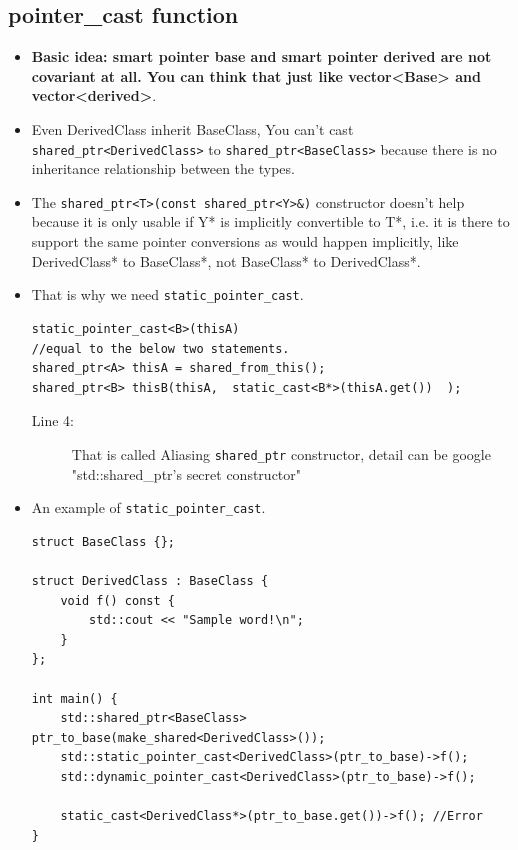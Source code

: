 \documentclass[a4paper,11pt,twoside]{book}
\begin{document}
\subsection{pointer\_cast function}
\begin{itemize}
	\item \textbf{Basic idea: smart pointer base and smart pointer derived are not covariant at all. You can think that just like vector<Base> and vector<derived>}.
			
	\item Even DerivedClass inherit BaseClass,  You can't cast \texttt{shared\_ptr<DerivedClass>} to \newline 
	\texttt{shared\_ptr<BaseClass>} because there is no inheritance relationship between the types. 
	
	\item The \texttt{shared\_ptr<T>(const shared\_ptr<Y>\&)} constructor doesn't help because it is only usable if Y* is implicitly convertible to T*, i.e. it is there to support the same pointer conversions as would happen implicitly, like DerivedClass* to BaseClass*, not BaseClass* to DerivedClass*.
	
	\item That is why we need \texttt{static\_pointer\_cast}.
\begin{lstlisting}
static_pointer_cast<B>(thisA)
//equal to the below two statements.
shared_ptr<A> thisA = shared_from_this();
shared_ptr<B> thisB(thisA,  static_cast<B*>(thisA.get())  );
\end{lstlisting}
\begin{description}
	\item[Line 4:] That is called Aliasing \texttt{shared\_ptr} constructor, detail can be google "std::shared\_ptr's secret constructor"
	
\end{description}

	\item An example of \texttt{static\_pointer\_cast}.
\begin{lstlisting}
struct BaseClass {};

struct DerivedClass : BaseClass {
	void f() const {
		std::cout << "Sample word!\n";
	}
};

int main() {
	std::shared_ptr<BaseClass> ptr_to_base(make_shared<DerivedClass>());
	std::static_pointer_cast<DerivedClass>(ptr_to_base)->f();
	std::dynamic_pointer_cast<DerivedClass>(ptr_to_base)->f();

	static_cast<DerivedClass*>(ptr_to_base.get())->f(); //Error
}
\end{lstlisting}

\end{itemize}
\end{document}
